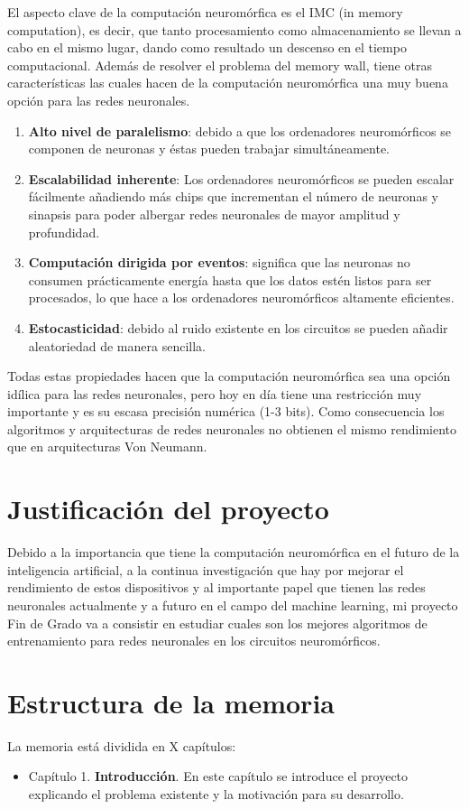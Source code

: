 El aspecto clave de la computación neuromórfica es el IMC (in memory computation), es decir, que tanto procesamiento como almacenamiento se llevan a cabo en el mismo lugar, dando como resultado un descenso en el tiempo computacional. Además de resolver el problema del memory wall, tiene otras características las cuales hacen de la computación neuromórfica una muy buena opción para las redes neuronales. 
\begin{enumerate}
    \item \textbf{Alto nivel de paralelismo}: debido a que los ordenadores neuromórficos se componen de neuronas y éstas pueden trabajar simultáneamente.
    \item \textbf{Escalabilidad inherente}: Los ordenadores neuromórficos se pueden escalar fácilmente añadiendo más chips que incrementan el número de neuronas y sinapsis para poder albergar redes neuronales de mayor amplitud y profundidad.
    \item \textbf{Computación dirigida por eventos}: significa que las neuronas no consumen prácticamente energía hasta que los datos estén listos para ser procesados, lo que hace a los ordenadores neuromórficos altamente eficientes.
    \item \textbf{Estocasticidad}: debido al ruido existente en los circuitos se pueden añadir aleatoriedad de manera sencilla.
\end{enumerate}

Todas estas propiedades hacen que la computación neuromórfica sea una opción idílica para las redes neuronales, pero hoy en día tiene una restricción muy importante y es su escasa precisión numérica (1-3 bits). Como consecuencia los algoritmos y arquitecturas de redes neuronales no obtienen el mismo rendimiento que en arquitecturas Von Neumann.

\section{Justificación del proyecto}
Debido a la importancia que tiene la computación neuromórfica en el futuro de la inteligencia artificial, a la continua investigación que hay por mejorar el rendimiento de estos dispositivos y al importante papel que tienen las redes neuronales actualmente y a futuro en el campo del machine learning, mi proyecto Fin de Grado va a consistir en estudiar cuales son los mejores algoritmos de entrenamiento para redes neuronales en los circuitos neuromórficos. 

\section{Estructura de la memoria}

La memoria está dividida en X capítulos:
\begin{itemize}
    \item Capítulo 1. \textbf{Introducción}. En este capítulo se introduce el proyecto explicando el problema existente y la motivación para su desarrollo.
\end{itemize}